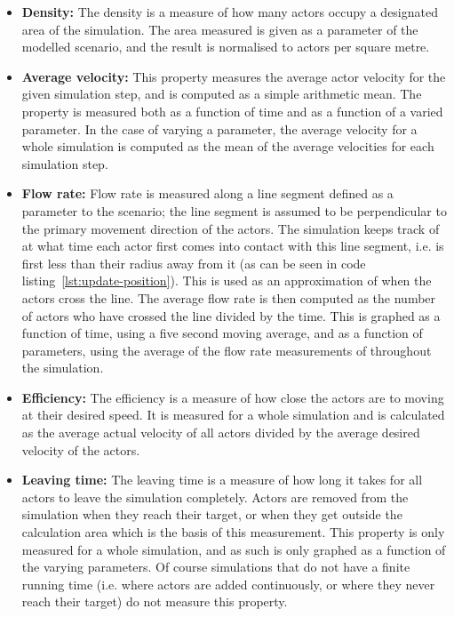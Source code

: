 \begin{itemize}
    \item \textbf{Density:} The density is a measure of how many actors occupy 
        a designated area of the simulation. The area measured is given as a 
        parameter of the modelled scenario, and the result is normalised to 
        actors per square metre.

    \item \textbf{Average velocity:} This property measures the average actor 
        velocity for the given simulation step, and is computed as a simple 
        arithmetic mean. The property is measured both as a function of time 
        and as a function of a varied parameter. In the case of varying a 
        parameter, the average velocity for a whole simulation is computed as 
        the mean of the average velocities for each simulation step.

    \item \textbf{Flow rate:} Flow rate is measured along a line segment 
        defined as a parameter to the scenario; the line segment is assumed to 
        be perpendicular to the primary movement direction of the actors. The 
        simulation keeps track of at what time each actor first comes into 
        contact with this line segment, i.e. is first less than their radius 
        away from it (as can be seen in code 
        listing~\ref{lst:update-position}). This is used as an approximation 
        of when the actors cross the line. The average flow rate is then 
        computed as the number of actors who have crossed the line divided by 
        the time.  This is graphed as a function of time, using a five second 
        moving average, and as a function of parameters, using the average of 
        the flow rate measurements of throughout the simulation.

    \item \textbf{Efficiency:} The efficiency is a measure of how close the 
        actors are to moving at their desired speed. It is measured for a 
        whole simulation and is calculated as the average actual velocity of 
        all actors divided by the average desired velocity of the actors.

    \item \textbf{Leaving time:} The leaving time is a measure of how long it 
        takes for all actors to leave the simulation completely. Actors are 
        removed from the simulation when they reach their target, or when they 
        get outside the calculation area which is the basis of this 
        measurement. This property is only measured for a whole simulation, 
        and as such is only graphed as a function of the varying parameters. 
        Of course simulations that do not have a finite running time (i.e. 
        where actors are added continuously, or where they never reach their 
        target) do not measure this property.
\end{itemize}
